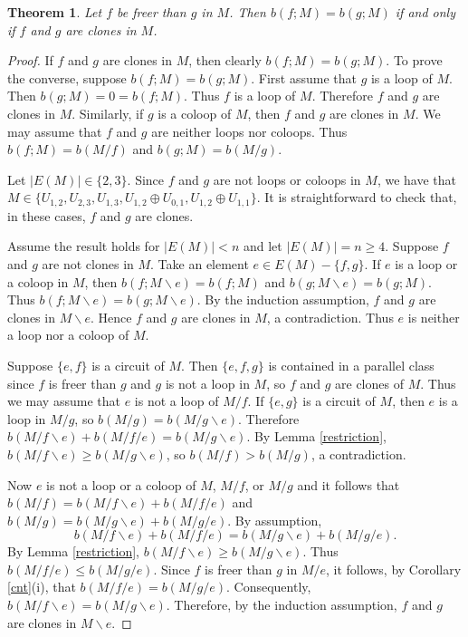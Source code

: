 \documentclass[12pt,reqno]{amsart}
\newtheorem{theorem}{Theorem}
\theoremstyle{definition}
\theoremstyle{remark}
\numberwithin{equation}{section}
\newcommand{\del}{\backslash}
\begin{document}
    \begin{theorem}\label{beq}
        Let $f$ be freer than $g$ in $M$. Then $b(f;M)=b(g;M)$ if and only if $f$ and $g$ are clones in $M$.     
    \end{theorem}
        \begin{proof}
            If $f$ and $g$ are clones in $M$, then clearly $b(f;M)=b(g;M)$. 
            To prove the converse, suppose $b(f;M)=b(g;M)$. 
            First assume that $g$ is a loop of $M$.             
            Then $b(g;M)=0=b(f;M)$. 
            Thus $f$ is a loop of $M$. 
            Therefore $f$ and $g$ are clones in $M$.
            Similarly, if $g$ is a coloop of $M$, then $f$ and $g$ are clones in $M$. 
            We may assume that $f$ and $g$ are neither loops nor coloops. 
            Thus $b(f;M)=b(M/f)$ and $b(g;M)=b(M/g)$. 

            Let $|E(M)|\in \{2,3\}$. 
            Since $f$ and $g$ are not loops or coloops in $M$, we have that $M\in \{U_{1,2}, U_{2,3}, U_{1,3},U_{1,2}\oplus U_{0,1}, U_{1,2}\oplus U_{1,1}\}$. It is straightforward to check that, in these cases, $f$ and $g$ are clones. 

            Assume the result holds for $|E(M)|<n$ and let $|E(M)|=n\geq 4$. 
            Suppose $f$ and $g$ are not clones in $M$. 
            Take an element $e\in E(M)-\{f,g\}$.
            If $e$ is a loop or a coloop in $M$, then $b(f;M\del e)=b(f;M)$ and $b(g;M\del e)=b(g;M)$. 
            Thus $b(f;M\del e)=b(g;M\del e)$. 
            By the induction assumption, $f$ and $g$ are clones in $M\del e$.  
            Hence $f$ and $g$ are clones in $M$, a contradiction. 
            Thus $e$ is neither a loop nor a coloop of $M$. 

            Suppose $\{e,f\}$ is a circuit of $M$. 
            Then $\{e,f,g\}$ is contained in a parallel class since $f$ is freer than $g$ and $g$ is not a loop in $M$, so $f$ and $g$ are clones of $M$.
            Thus we may assume that $e$ is not a loop of $M/f$.
            If $\{e,g\}$ is a circuit of $M$, then $e$ is a loop in $M/g$, so $b(M/g)=b(M/g\del e)$. 
            Therefore $b(M/f\del e)+b(M/f/e)=b(M/g\del e)$. 
            By Lemma \ref{restriction}, $b(M/f\del e)\geq b(M/g\del e)$, so $b(M/f)>b(M/g)$, a contradiction.  

            Now $e$ is not a loop or a coloop of $M$, $M/f $, or $M/g$ and it follows that $b(M/f)=b(M/f\del e)+b(M/f/e)$ and $b(M/g)=b(M/g\del e)+b(M/g/e)$.
            By assumption,  
            \[
                b(M/f\del e)+b(M/f/e)=b(M/g\del e)+b(M/g/e).  
            \] 
            By Lemma \ref{restriction}, $b(M/f\del e)\geq b(M/g\del e)$. 
            Thus $b(M/f/e)\leq b(M/g/e)$.
            Since $f$ is freer than $g$ in $M/e$, it follows, by Corollary \ref{cnt}(i), that $b(M/f/e)=b(M/g/e)$.
            Consequently, $b(M/f\del e)=b(M/g\del e)$. 
            Therefore, by the induction assumption, $f$ and $g$ are clones in $M\del e$.  



\end{proof}
\end{document}
